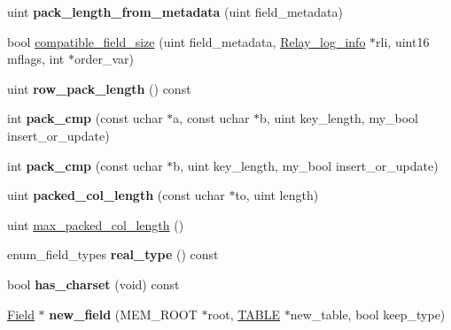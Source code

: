 \begin{DoxyCompactItemize}
\item 
\mbox{\label{classField__string_a7cc072cb2d79712c9d35a8fd33225a5e}} 
uint {\bfseries pack\+\_\+length\+\_\+from\+\_\+metadata} (uint field\+\_\+metadata)
\item 
bool \mbox{\hyperlink{classField__string_aa3397924d82ab8bb0c954b19c12de9a0}{compatible\+\_\+field\+\_\+size}} (uint field\+\_\+metadata, \mbox{\hyperlink{classRelay__log__info}{Relay\+\_\+log\+\_\+info}} $\ast$rli, uint16 mflags, int $\ast$order\+\_\+var)
\item 
\mbox{\label{classField__string_a592c4d6b64c3cf190024a2bb426020d1}} 
uint {\bfseries row\+\_\+pack\+\_\+length} () const
\item 
\mbox{\label{classField__string_a1a80511f7d40f24e63d69935824cbb4d}} 
int {\bfseries pack\+\_\+cmp} (const uchar $\ast$a, const uchar $\ast$b, uint key\+\_\+length, my\+\_\+bool insert\+\_\+or\+\_\+update)
\item 
\mbox{\label{classField__string_a0ba08eb157bb3bfb77a04aa97d17e156}} 
int {\bfseries pack\+\_\+cmp} (const uchar $\ast$b, uint key\+\_\+length, my\+\_\+bool insert\+\_\+or\+\_\+update)
\item 
\mbox{\label{classField__string_af91436da887b39531e60e13f4d186158}} 
uint {\bfseries packed\+\_\+col\+\_\+length} (const uchar $\ast$to, uint length)
\item 
uint \mbox{\hyperlink{classField__string_aefd90b60a7e413fd914d1eb481ed4545}{max\+\_\+packed\+\_\+col\+\_\+length}} ()
\item 
\mbox{\label{classField__string_ac9f28a84bd98e81963c2d7190d2444a6}} 
enum\+\_\+field\+\_\+types {\bfseries real\+\_\+type} () const
\item 
\mbox{\label{classField__string_aa0ccf5e4d92fbbf3ac90038ca5f02fe2}} 
bool {\bfseries has\+\_\+charset} (void) const
\item 
\mbox{\label{classField__string_a506d28bba30e8eca0a09c99fe1fc2faf}} 
\mbox{\hyperlink{classField}{Field}} $\ast$ {\bfseries new\+\_\+field} (M\+E\+M\+\_\+\+R\+O\+OT $\ast$root, \mbox{\hyperlink{structTABLE}{T\+A\+B\+LE}} $\ast$new\+\_\+table, bool keep\+\_\+type)

\end{DoxyCompactItemize}
